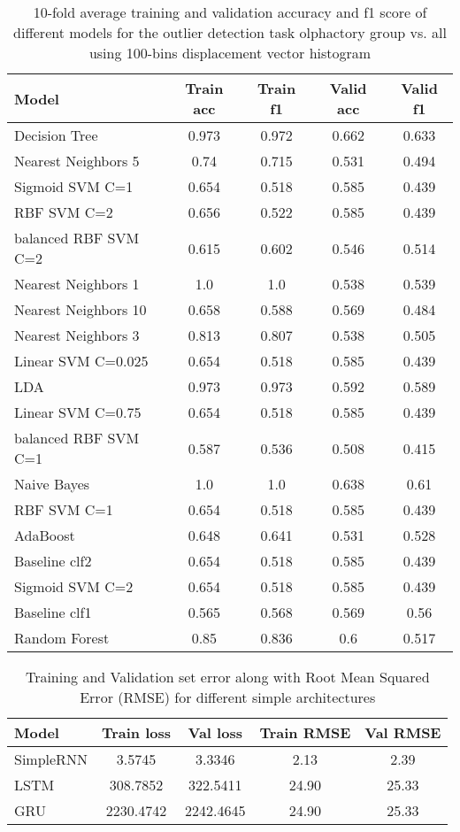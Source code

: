 \documentclass[letterpaper, 10pt, conference]{ieeeconf}  %
\begin{document}
\begin{center}
\begin{table}[h!]
\begin{tabular}{lcccc}
Model & Train acc & Train f1 & Valid acc & Valid f1 \\ \hline 
Decision Tree & 0.973 & 0.972 & 0.662 & 0.633\\
Nearest Neighbors 5 & 0.74 & 0.715 & 0.531 & 0.494\\
Sigmoid SVM C=1 & 0.654 & 0.518 & 0.585 & 0.439\\
RBF SVM C=2 & 0.656 & 0.522 & 0.585 & 0.439\\
balanced RBF SVM C=2 & 0.615 & 0.602 & 0.546 & 0.514\\
Nearest Neighbors 1 & 1.0 & 1.0 & 0.538 & 0.539\\
Nearest Neighbors 10 & 0.658 & 0.588 & 0.569 & 0.484\\
Nearest Neighbors 3 & 0.813 & 0.807 & 0.538 & 0.505\\
Linear SVM C=0.025 & 0.654 & 0.518 & 0.585 & 0.439\\
LDA & 0.973 & 0.973 & 0.592 & 0.589\\
Linear SVM C=0.75 & 0.654 & 0.518 & 0.585 & 0.439\\
balanced RBF SVM C=1 & 0.587 & 0.536 & 0.508 & 0.415\\
Naive Bayes & 1.0 & 1.0 & 0.638 & 0.61\\
RBF SVM C=1 & 0.654 & 0.518 & 0.585 & 0.439\\
AdaBoost & 0.648 & 0.641 & 0.531 & 0.528\\
Baseline clf2 & 0.654 & 0.518 & 0.585 & 0.439\\
Sigmoid SVM C=2 & 0.654 & 0.518 & 0.585 & 0.439\\
Baseline clf1 & 0.565 & 0.568 & 0.569 & 0.56\\
Random Forest & 0.85 & 0.836 & 0.6 & 0.517\\
\end{tabular}
\caption{\label{outlier-classic-result2} 10-fold average training and validation accuracy and f1 score of different models for the outlier detection task olphactory group vs. all using 100-bins displacement vector histogram}
\end{table}
\end{center}


\begin{center}
\begin{table}
\begin{tabular}{lcccc}
Model & Train loss & Val loss & Train RMSE & Val RMSE \\ \hline 
SimpleRNN & 3.5745 & 3.3346 & 2.13 & 2.39\\
LSTM & 308.7852 & 322.5411 & 24.90 & 25.33\\
GRU & 2230.4742 & 2242.4645 & 24.90 & 25.33\\
\end{tabular}
\caption{\label{simple_losses} Training and Validation set error along with Root Mean Squared Error (RMSE) for different simple architectures}
\end{table}
\end{center}
\end{document}

